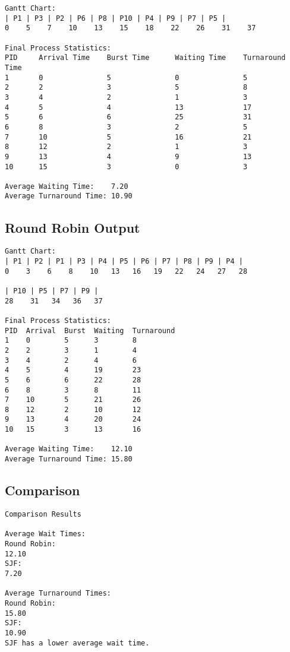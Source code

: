 \documentclass[12pt]{article}
\begin{document}
\begin{verbatim}
Gantt Chart:
| P1 | P3 | P2 | P6 | P8 | P10 | P4 | P9 | P7 | P5 |
0    5    7    10    13    15    18    22    26    31    37

Final Process Statistics:
PID     Arrival Time    Burst Time      Waiting Time    Turnaround Time
1       0               5               0               5
2       2               3               5               8
3       4               2               1               3
4       5               4               13              17
5       6               6               25              31
6       8               3               2               5
7       10              5               16              21
8       12              2               1               3
9       13              4               9               13
10      15              3               0               3

Average Waiting Time:    7.20
Average Turnaround Time: 10.90
\end{verbatim}

\subsection{Round Robin Output}

\begin{verbatim}
Gantt Chart:
| P1 | P2 | P1 | P3 | P4 | P5 | P6 | P7 | P8 | P9 | P4 |
0    3    6    8    10   13   16   19   22   24   27   28

| P10 | P5 | P7 | P9 |
28    31   34   36   37
    
Final Process Statistics:
PID  Arrival  Burst  Waiting  Turnaround
1    0        5      3        8
2    2        3      1        4
3    4        2      4        6
4    5        4      19       23
5    6        6      22       28
6    8        3      8        11
7    10       5      21       26
8    12       2      10       12
9    13       4      20       24
10   15       3      13       16

Average Waiting Time:    12.10
Average Turnaround Time: 15.80
\end{verbatim}

\subsection{Comparison}

\begin{verbatim}
Comparison Results

Average Wait Times:
Round Robin:
12.10
SJF:
7.20

Average Turnaround Times:
Round Robin:
15.80
SJF:
10.90
SJF has a lower average wait time.
\end{verbatim}
\end{document}
